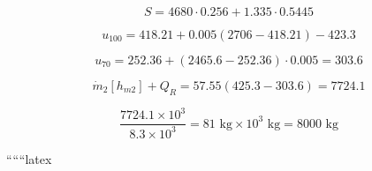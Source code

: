 \[
S = 4680 \cdot 0.256 + 1.335 \cdot 0.5445
\]

\[
u_{100} = 418.21 + 0.005 \left( 2706 - 418.21 \right) - 423.3
\]

\[
u_{70} = 252.36 + \left( 2465.6 - 252.36 \right) \cdot 0.005 = 303.6
\]

\[
\dot{m}_2 \left[ h_{m2} \right] + Q_R = 57.55 \left( 425.3 - 303.6 \right) = 7724.1
\]

\[
\frac{7724.1 \times 10^3}{8.3 \times 10^3} = 81 \text{ kg} \times 10^3 \text{ kg} = 8000 \text{ kg}
\]

``````latex


